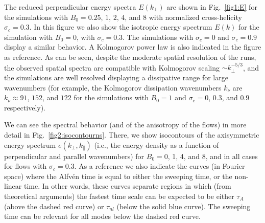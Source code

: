 \documentclass[aip,pop,reprint,amsmath,amssymb,floatfix]{revtex4-1}
\begin{document}
The reduced perpendicular
energy spectra $E(k_\perp)$ are shown in Fig.~\ref{fig1:E} for the
simulations with $B_0 = 0.25$, $1$, $2$, $4$, and $8$ with normalized
cross-helicity $\sigma_c=0.3$. In this figure we also show the 
isotropic energy spectrum $E(k)$ for the simulation with $B_0 = 0$, 
with $\sigma_c=0.3$.  The simulations with $\sigma_c=0$ and 
$\sigma_c=0.9$ display a similar behavior. A Kolmogorov power law is 
also indicated in the figure as reference.  As can be seen, despite 
the moderate spatial resolution of the runs, the observed spatial 
spectra are compatible with Kolmogorov scaling $\sim k_\perp^{-5/3}$, 
and the simulations are well resolved displaying a dissipative range 
for large wavenumbers (for example, the Kolmogorov dissipation 
wavenumbers $k_\nu$ are $k_\nu \approx 91$, $152$, and $122$ for the 
simulations with $B_0 = 1$ and $\sigma_c = 0$, $0.3$, and $0.9$ 
respectively).

We can see the spectral behavior (and of the anisotropy of the flows)
in more detail in Fig.~\ref{fig2:isocontourns}. There, we show
isocontours of the axisymmetric energy spectrum $e(k_\perp,
k_\parallel)$ (i.e., the energy density as a function of perpendicular
and parallel wavenumbers) for $B_0=0$, 1, 4, and 8, and in all cases
for flows with $\sigma_c = 0.3$. As a reference we also indicate the
curves (in Fourier space) where the Alfv\'en time is equal to either
the sweeping time, or the non-linear time. In other words, these
curves separate regions in which (from theoretical arguments) the
fastest time scale can be expected to be either $\tau_A$ (above the
dashed red curve) or $\tau_{nl}$ (below the solid blue curve). The
sweeping time can be relevant for all modes below the dashed red
curve.
\end{document}
